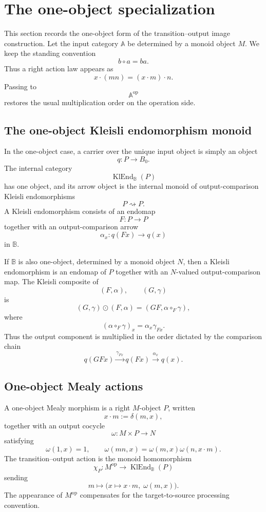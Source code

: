 \section{The one-object specialization}
\label{sec:to-one-object-specialization}

This section records the one-object form of the transition--output image
construction. Let the input category \(\mathbb A\) be determined by a monoid
object \(M\). We keep the standing convention
\[
    b\circ a=ba .
\]
Thus a right action law appears as
\[
    x\cdot(mn)=(x\cdot m)\cdot n.
\]
Passing to
\[
    \mathbb A^{\mathrm{op}}
\]
restores the usual multiplication order on the operation side.

\subsection{The one-object Kleisli endomorphism monoid}
\label{subsec:to-one-object-klend}

In the one-object case, a carrier over the unique input object is simply an
object
\[
    q:P\to B_0.
\]
The internal category
\[
    \operatorname{KlEnd}_{\mathbb B}(P)
\]
has one object, and its arrow object is the internal monoid of
output-comparison Kleisli endomorphisms
\[
    P\rightsquigarrow P.
\]
A Kleisli endomorphism consists of an endomap
\[
    F:P\to P
\]
together with an output-comparison arrow
\[
    \alpha_x:q(Fx)\to q(x)
\]
in \(\mathbb B\).

If \(\mathbb B\) is also one-object, determined by a monoid object \(N\), then
a Kleisli endomorphism is an endomap of \(P\) together with an \(N\)-valued
output-comparison map. The Kleisli composite of
\[
    (F,\alpha),\qquad (G,\gamma)
\]
is
\[
    (G,\gamma)\odot(F,\alpha)
    =
    (GF,\alpha\circ_F\gamma),
\]
where
\[
    (\alpha\circ_F\gamma)_x
    =
    \alpha_x\gamma_{Fx}.
\]
Thus the output component is multiplied in the order dictated by the
comparison chain
\[
    q(GFx)\xrightarrow{\gamma_{Fx}}q(Fx)
    \xrightarrow{\alpha_x}q(x).
\]

\subsection{One-object Mealy actions}
\label{subsec:to-one-object-mealy-actions}

A one-object Mealy morphism is a right \(M\)-object \(P\), written
\[
    x\cdot m:=\delta(m,x),
\]
together with an output cocycle
\[
    \omega:M\times P\to N
\]
satisfying
\[
    \omega(1,x)=1,
    \qquad
    \omega(mn,x)=\omega(m,x)\omega(n,x\cdot m).
\]
The transition--output action is the monoid homomorphism
\[
    \chi_P:
    M^{\mathrm{op}}\to
    \operatorname{KlEnd}_{\mathbb B}(P)
\]
sending
\[
    m\longmapsto
    \bigl(x\mapsto x\cdot m,\;\omega(m,x)\bigr).
\]
The appearance of \(M^{\mathrm{op}}\) compensates for the target-to-source
processing convention.

